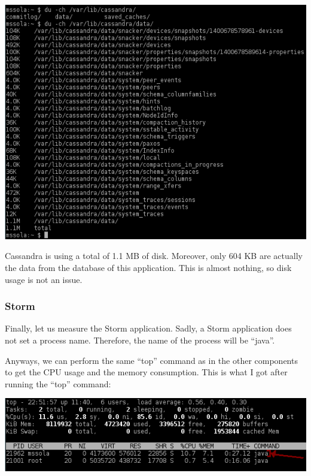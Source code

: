 \begin{center}
  \includegraphics[scale=0.8]{hardware/images/cassandra-disk.png}
\end{center}

Cassandra is using a total of 1.1 MB of disk. Moreover, only 604 KB are
actually the data from the database of this application. This is almost
nothing, so disk usage is not an issue.

\subsubsection*{Storm}

Finally, let us measure the Storm application. Sadly, a Storm application does
not set a process name. Therefore, the name of the process will be ``java''.

Anyways, we can perform the same ``top'' command as in the other components to
get the CPU usage and the memory consumption. This is what I got after running
the ``top'' command:

\begin{center}
  \includegraphics[scale=0.8]{hardware/images/storm.png}
\end{center}

